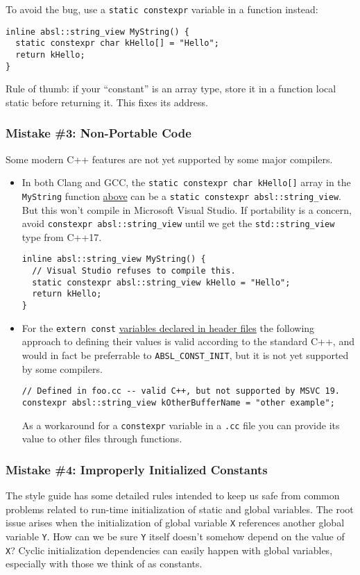 To avoid the bug, use a \texttt{static constexpr} variable in a function instead:
\begin{verbatim}
inline absl::string_view MyString() {
  static constexpr char kHello[] = "Hello";
  return kHello;
}
\end{verbatim}
Rule of thumb: if your \enquote{constant} is an array type, store it in a function local static before returning it. This fixes its address.

\subsubsection{Mistake \#3: Non-Portable Code}\label{subsubsec:non-portable-mistake}
Some modern C++ features are not yet supported by some major compilers.
\begin{itemize}
    \item In both Clang and GCC, the \texttt{static constexpr char kHello[]} array in the \texttt{MyString} function \hyperref[subsubsec:string-view-mistake]{above} can be a \texttt{static constexpr absl::string_view}. But this won’t compile in Microsoft Visual Studio. If portability is a concern, avoid \texttt{constexpr absl::string_view} until we get the \texttt{std::string_view} type from C++17.
    \begin{verbatim}
inline absl::string_view MyString() {
  // Visual Studio refuses to compile this.
  static constexpr absl::string_view kHello = "Hello";
  return kHello;
}
    \end{verbatim}
    \item For the \texttt{extern const} \hyperref[subsec:an-extern-const-variable]{variables declared in header files} the following approach to defining their values is valid according to the standard C++, and would in fact be preferrable to \texttt{ABSL_CONST_INIT}, but it is not yet supported by some compilers.
    \begin{verbatim}
// Defined in foo.cc -- valid C++, but not supported by MSVC 19.
constexpr absl::string_view kOtherBufferName = "other example";
    \end{verbatim}
    As a workaround for a \texttt{constexpr} variable in a \texttt{.cc} file you can provide its value to other files through functions.
\end{itemize}

\subsubsection{Mistake \#4: Improperly Initialized Constants}
The style guide has some detailed rules intended to keep us safe from common problems related to run-time initialization of static and global variables. The root issue arises when the initialization of global variable \texttt{X} references another global variable \texttt{Y}. How can we be sure \texttt{Y} itself doesn’t somehow depend on the value of \texttt{X}? Cyclic initialization dependencies can easily happen with global variables, especially with those we think of as constants.

